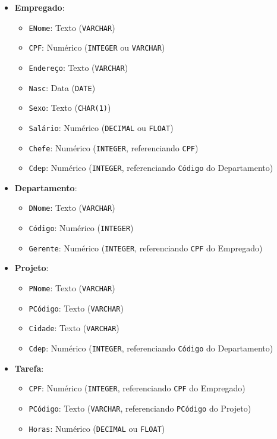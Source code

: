 \documentclass[a4paper,12pt]{article}
\begin{document}
\begin{itemize}
    \item \textbf{Empregado}:
    \begin{itemize}
        \item \texttt{ENome}: Texto (\texttt{VARCHAR})
        \item \texttt{CPF}: Numérico (\texttt{INTEGER} ou \texttt{VARCHAR})
        \item \texttt{Endereço}: Texto (\texttt{VARCHAR})
        \item \texttt{Nasc}: Data (\texttt{DATE})
        \item \texttt{Sexo}: Texto (\texttt{CHAR(1)})
        \item \texttt{Salário}: Numérico (\texttt{DECIMAL} ou \texttt{FLOAT})
        \item \texttt{Chefe}: Numérico (\texttt{INTEGER}, referenciando \texttt{CPF})
        \item \texttt{Cdep}: Numérico (\texttt{INTEGER}, referenciando \texttt{Código} do Departamento)
    \end{itemize}

    \item \textbf{Departamento}:
    \begin{itemize}
        \item \texttt{DNome}: Texto (\texttt{VARCHAR})
        \item \texttt{Código}: Numérico (\texttt{INTEGER})
        \item \texttt{Gerente}: Numérico (\texttt{INTEGER}, referenciando \texttt{CPF} do Empregado)
    \end{itemize}

    \item \textbf{Projeto}:
    \begin{itemize}
        \item \texttt{PNome}: Texto (\texttt{VARCHAR})
        \item \texttt{PCódigo}: Texto (\texttt{VARCHAR})
        \item \texttt{Cidade}: Texto (\texttt{VARCHAR})
        \item \texttt{Cdep}: Numérico (\texttt{INTEGER}, referenciando \texttt{Código} do Departamento)
    \end{itemize}

    \item \textbf{Tarefa}:
    \begin{itemize}
        \item \texttt{CPF}: Numérico (\texttt{INTEGER}, referenciando \texttt{CPF} do Empregado)
        \item \texttt{PCódigo}: Texto (\texttt{VARCHAR}, referenciando \texttt{PCódigo} do Projeto)
        \item \texttt{Horas}: Numérico (\texttt{DECIMAL} ou \texttt{FLOAT})
    \end{itemize}


\end{itemize}
\end{document}
